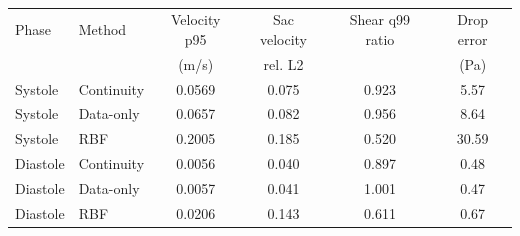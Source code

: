 \begin{table}[htbp]
\centering
\small
\caption{}
\label{tab:local_metrics}
\begin{tabular}{llcccc}
\toprule
Phase & Method & Velocity p95 & Sac velocity & Shear q99 ratio & Drop error \\ & & (m/s) & rel. L2 & & (Pa) \\
\midrule
Systole & Continuity & 0.0569 & 0.075 & 0.923 & 5.57 \\
Systole & Data-only & 0.0657 & 0.082 & 0.956 & 8.64 \\
Systole & RBF & 0.2005 & 0.185 & 0.520 & 30.59 \\
Diastole & Continuity & 0.0056 & 0.040 & 0.897 & 0.48 \\
Diastole & Data-only & 0.0057 & 0.041 & 1.001 & 0.47 \\
Diastole & RBF & 0.0206 & 0.143 & 0.611 & 0.67 \\
\bottomrule
\end{tabular}
\end{table}
